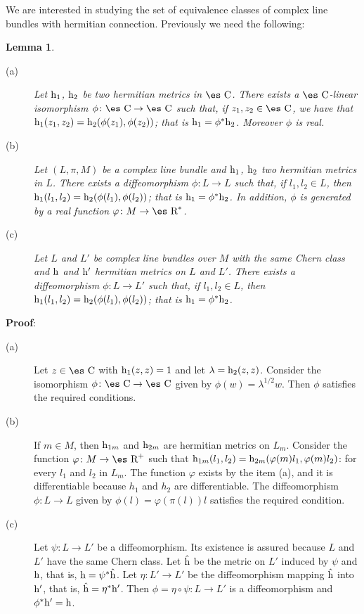 \documentclass[12pt]{article}
\theoremstyle{plain}
\newtheorem{lem}{Lemma}
\def\qed{\ifvmode\removelastskip\fi
{\unskip\nobreak\hfil\penalty50\hbox{}\nobreak\hfil
\hbox{\vrule height1.2ex width1.2ex}\parfillskip=0pt
\finalhyphendemerits=0 \par\smallskip}}
\def\h{{\rm h}}
\def\Real{\mbox{\es R}}
\def\Complex{\mbox{\es C}}
\begin{document}
We are interested in studying the set of
equivalence classes of complex line bundles with hermitian connection.
Previously we need the following:

\begin{lem}
\begin{description}
\item[{\rm (a)}]
Let $\h_1$, $\h_2$ be
two hermitian metrics in $\Complex$.
There exists a $\Complex$-linear isomorphism
$\phi \colon \Complex \to \Complex$
such that, if $z_1,z_2 \in \Complex$,
we have that $\h_1(z_1,z_2) = \h_2(\phi (z_1),\phi (z_2))$;
that is $\h_1 = \phi^*\h_2$.
Moreover $\phi$ is real.
\item[{\rm (b)}]
Let $(L,\pi ,M)$ be a complex line bundle
and $\h_1$, $\h_2$
two hermitian metrics in $L$.
There exists a diffeomorphism
$\phi \colon L \to L$
such that, if $l_1,l_2 \in L$,
then $\h_1(l_1,l_2) = \h_2(\phi (l_1),\phi (l_2))$;
that is $\h_1 = \phi^*\h_2$.
In addition, $\phi$ is generated by a real function
$\varphi \colon M \to \Real^*$.
\item[{\rm (c)}]
Let $L$ and $L'$ be complex line bundles over $M$
with the same Chern class and $\h$ and $\h '$
hermitian metrics on $L$ and $L'$.
There exists a diffeomorphism $\phi \colon L \to L'$
such that, if $l_1,l_2 \in L$,
then $\h_1(l_1,l_2) = \h_2(\phi (l_1),\phi (l_2))$;
that is $\h_1 = \phi^*\h_2$.
\end{description}
\end{lem}
{\bf Proof}: 
\begin{description}
\item[{\rm (a)}]
Let $z \in \Complex$ with $\h_1(z,z)=1$
and let $\lambda = \h_2(z,z)$.
Consider the isomorphism $\phi \colon \Complex \to \Complex$
given by $\phi (w) = \lambda^{1/2}w$.
Then $\phi$ satisfies the required conditions.
\item[{\rm (b)}]
If $m \in M$, then $\h_{1m}$ and $\h_{2m}$
are hermitian metrics on $L_m$.
Consider the function $\varphi \colon M \to \Real^+$ such that
$\h_{1m}(l_1,l_2) = \h_{2m}(\varphi (m)l_1,\varphi (m)l_2)$:
for every $l_1$ and $l_2$ in $L_m$. The function $\varphi$ exists
by the item (a), and it is differentiable because $h_1$ and $h_2$ are
differentiable.
The diffeomorphism $\phi \colon L \to L$ given by
$\phi (l) = \varphi (\pi (l))l$ satisfies the required condition.
\item[{\rm (c)}]
Let $\psi \colon L \to L'$ be a diffeomorphism.
Its existence is assured because $L$ and $L'$
have the same Chern class.
Let $\hat \h$ be the metric on $L'$ induced by $\psi$ and $\h$,
that is, $\h = \psi^* \hat \h$.
Let $\eta \colon L' \to L'$ be the diffeomorphism
mapping $\hat \h$ into $\h '$, that is,
$\hat \h = \eta ^* \h '$.
Then $\phi = \eta \circ \psi \colon L \to L'$
is a diffeomorphism and $\phi^* \h ' = \h$.
\end{description}
\qed
\end{document}
